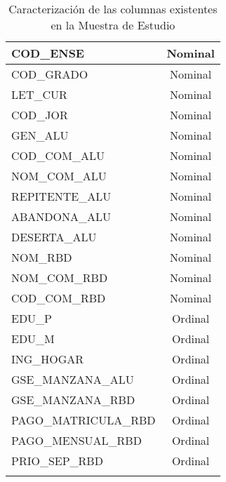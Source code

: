 \begin{longtable}{|l|c|}
COD\_ENSE                             & Nominal           \\ \hline
COD\_GRADO                            & Nominal           \\ \hline
LET\_CUR                              & Nominal           \\ \hline
COD\_JOR                              & Nominal           \\ \hline
GEN\_ALU                              & Nominal           \\ \hline
COD\_COM\_ALU                         & Nominal           \\ \hline
NOM\_COM\_ALU                         & Nominal           \\ \hline
REPITENTE\_ALU                        & Nominal           \\ \hline
ABANDONA\_ALU                         & Nominal           \\ \hline
DESERTA\_ALU                          & Nominal           \\ \hline
NOM\_RBD                              & Nominal           \\ \hline
NOM\_COM\_RBD                         & Nominal           \\ \hline
COD\_COM\_RBD                         & Nominal           \\ \hline
EDU\_P                                & Ordinal           \\ \hline
EDU\_M                                & Ordinal           \\ \hline
ING\_HOGAR                            & Ordinal           \\ \hline
GSE\_MANZANA\_ALU                     & Ordinal           \\ \hline
GSE\_MANZANA\_RBD                     & Ordinal           \\ \hline
PAGO\_MATRICULA\_RBD                  & Ordinal           \\ \hline
PAGO\_MENSUAL\_RBD                    & Ordinal           \\ \hline
PRIO\_SEP\_RBD                        & Ordinal           \\ \hline
\caption{Caracterización de las columnas existentes en la Muestra de Estudio}
\label{tab:caract-var}
\end{longtable}